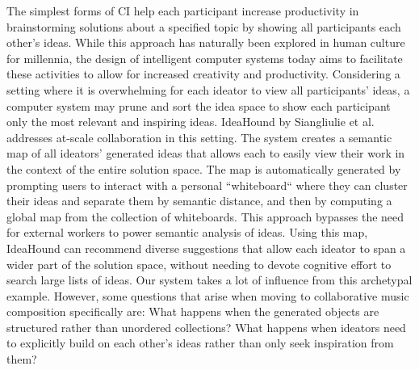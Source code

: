 \documentclass[final,authoryear,11pt,times]{elsarticle}
\begin{document}
The simplest forms of CI help each participant increase productivity in brainstorming solutions about a specified topic by showing all participants each other's ideas. While this approach has naturally been explored in human culture for millennia, the design of intelligent computer systems today aims to facilitate these activities to allow for increased creativity and productivity. Considering a setting where it is overwhelming for each ideator to view all participants' ideas, a computer system may prune and sort the idea space to show each participant only the most relevant and inspiring ideas. IdeaHound by Siangliulie et al. addresses at-scale collaboration in this setting. The system creates a semantic map of all ideators' generated ideas that allows each to easily view their work in the context of the entire solution space. The map is automatically generated by prompting users to interact with a personal ``whiteboard`` where they can cluster their ideas and separate them by semantic distance, and then by computing a global map from the collection of whiteboards. This approach bypasses the need for external workers to power semantic analysis of ideas. Using this map, IdeaHound can recommend diverse suggestions that allow each ideator to span a wider part of the solution space, without needing to devote cognitive effort to search large lists of ideas. Our system takes a lot of influence from this archetypal example. However, some questions that arise when moving to collaborative music composition specifically are: What happens when the generated objects are structured rather than unordered collections? What happens when ideators need to explicitly build on each other's ideas rather than only seek inspiration from them?
\end{document}
